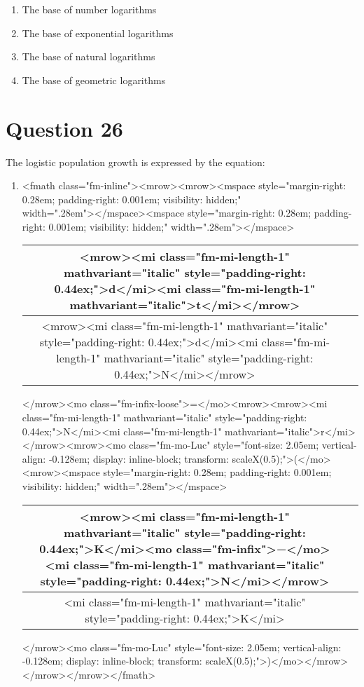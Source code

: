 \documentclass{article}
\begin{document}
\begin{enumerate}[label=(\alph*)]
\item  The base of number logarithms
\item  The base of exponential logarithms
\item  The base of natural logarithms
\item  The base of geometric logarithms
\end{enumerate}
\newpage
\section*{Question 26}
The logistic population growth is expressed by the equation:  
\begin{enumerate}[label=(\alph*)]
\item  <fmath class="fm-inline"><mrow><mrow><mspace style="margin-right: 0.28em; padding-right: 0.001em; visibility: hidden;" width=".28em">‌</mspace><mspace style="margin-right: 0.28em; padding-right: 0.001em; visibility: hidden;" width=".28em">‌</mspace>\begin{tabular}{|c|c|}
\hline
<mrow><mi class="fm-mi-length-1" mathvariant="italic" style="padding-right: 0.44ex;">d</mi><mi class="fm-mi-length-1" mathvariant="italic">t</mi></mrow> \\
\hline
<mrow><mi class="fm-mi-length-1" mathvariant="italic" style="padding-right: 0.44ex;">d</mi><mi class="fm-mi-length-1" mathvariant="italic" style="padding-right: 0.44ex;">N</mi></mrow> \\
\hline
\end{tabular}
</mrow><mo class="fm-infix-loose">=</mo><mrow><mrow><mi class="fm-mi-length-1" mathvariant="italic" style="padding-right: 0.44ex;">N</mi><mi class="fm-mi-length-1" mathvariant="italic">r</mi></mrow><mrow><mo class="fm-mo-Luc" style="font-size: 2.05em; vertical-align: -0.128em; display: inline-block; transform: scaleX(0.5);">(</mo><mrow><mspace style="margin-right: 0.28em; padding-right: 0.001em; visibility: hidden;" width=".28em">‌</mspace>\begin{tabular}{|c|c|}
\hline
<mrow><mi class="fm-mi-length-1" mathvariant="italic" style="padding-right: 0.44ex;">K</mi><mo class="fm-infix">−</mo><mi class="fm-mi-length-1" mathvariant="italic" style="padding-right: 0.44ex;">N</mi></mrow> \\
\hline
<mi class="fm-mi-length-1" mathvariant="italic" style="padding-right: 0.44ex;">K</mi> \\
\hline
\end{tabular}
</mrow><mo class="fm-mo-Luc" style="font-size: 2.05em; vertical-align: -0.128em; display: inline-block; transform: scaleX(0.5);">)</mo></mrow></mrow></mrow></fmath>

\end{enumerate}
\end{document}
